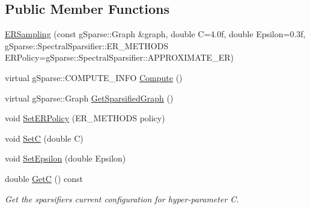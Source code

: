 \subsection*{Public Member Functions}
\begin{DoxyCompactItemize}
\item 
\mbox{\hyperlink{classg_sparse_1_1_spectral_sparsifier_1_1_e_r_sampling_a1ceb48c424600cbe6d315f3f5bad1598}{E\+R\+Sampling}} (const g\+Sparse\+::\+Graph \&graph, double C=4.\+0f, double Epsilon=0.\+3f, g\+Sparse\+::\+Spectral\+Sparsifier\+::\+E\+R\+\_\+\+M\+E\+T\+H\+O\+D\+S E\+R\+Policy=g\+Sparse\+::\+Spectral\+Sparsifier\+::\+A\+P\+P\+R\+O\+X\+I\+M\+A\+T\+E\+\_\+\+E\+R)
\item 
virtual g\+Sparse\+::\+C\+O\+M\+P\+U\+T\+E\+\_\+\+I\+N\+FO \mbox{\hyperlink{classg_sparse_1_1_spectral_sparsifier_1_1_e_r_sampling_a4751e449a9c2fa43b57db6eb703a622d}{Compute}} ()
\item 
virtual g\+Sparse\+::\+Graph \mbox{\hyperlink{classg_sparse_1_1_spectral_sparsifier_1_1_e_r_sampling_a5322f1076777028699d010daa5cd2406}{Get\+Sparsified\+Graph}} ()
\item 
void \mbox{\hyperlink{classg_sparse_1_1_spectral_sparsifier_1_1_e_r_sampling_a35cf40021c7fa90b5dda042896691bff}{Set\+E\+R\+Policy}} (E\+R\+\_\+\+M\+E\+T\+H\+O\+DS policy)
\item 
void \mbox{\hyperlink{classg_sparse_1_1_spectral_sparsifier_1_1_e_r_sampling_a35bf03bbda2e0d37345ce8d460e734a4}{SetC}} (double C)
\item 
void \mbox{\hyperlink{classg_sparse_1_1_spectral_sparsifier_1_1_e_r_sampling_a57eceac9af3b8846c3370eca999a9a57}{Set\+Epsilon}} (double Epsilon)
\item 
\mbox{\label{classg_sparse_1_1_spectral_sparsifier_1_1_e_r_sampling_abd617a6dacb79fda563caf6509972667}} 
double \mbox{\hyperlink{classg_sparse_1_1_spectral_sparsifier_1_1_e_r_sampling_abd617a6dacb79fda563caf6509972667}{GetC}} () const
\begin{DoxyCompactList}\small\item\em Get the sparsifier\textquotesingle{}s current configuration for hyper-\/parameter C. \end{DoxyCompactList}\item 
\mbox{\label{classg_sparse_1_1_spectral_sparsifier_1_1_e_r_sampling_a57a513740f9eff3113b518132c60cb0a}} 

\end{DoxyCompactItemize}
